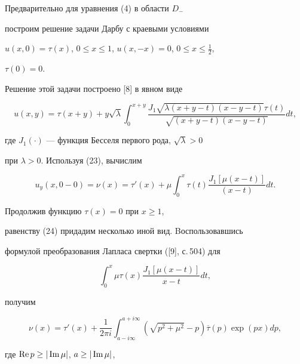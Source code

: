 \begin{pf}


Предварительно для уравнения (4) в области $D_-$


построим решение задачи Дарбу с краевыми условиями


$u(x,0)=\tau (x)$, $0\le x\le 1$, $u(x,-x)=0$, $0\le x\le \frac {1}{2}$,


$\tau (0)=0$.





Решение этой задачи построено [8] в явном виде


\begin{equation}


u(x,y)=\tau (x+y)+y\sqrt {\lambda }\int_0^{x+y}


\frac {J_1\sqrt {\lambda (x+y-t)(x-y-t)}\tau (t)}{\sqrt{(x+y-t)(x-y-t)}}dt,


\end{equation}


где $J_1(\cdot )$ --- функция Бесселя первого рода, $\sqrt {\lambda }>0$


при $\lambda >0$. Используя (23), вычислим


\begin{equation}


u_y(x,0-0)=\nu (x)=\tau '(x)+\mu \int_0^x\tau (t)


\frac {J_1[\mu (x-t)]}{(x-t)}dt.


\end{equation}


Продолжив функцию $\tau (x)=0$ при $x\ge 1$,


равенству (24) придадим несколько иной вид. Bоспользовавшись


формулой преобразования Лапласа свертки ([9], с.\,504) для


$$


\int_0^x \mu \tau (x)\frac {J_1[\mu (x-t)]}{x-t}dt,


$$


получим


\begin{equation}


\nu (x)=\tau '(x)+\frac {1}{2\pi i}\int_{a-i\infty }^{a


+i\infty }(\sqrt {p^2+\mu ^2}-p)\overline {\tau }(p) \exp(px)dp,


\end{equation}


где $\operatorname{Re} p\ge |\operatorname{Im} \mu |$, $a\ge |\operatorname{Im} \mu |$,



\end{pf}
